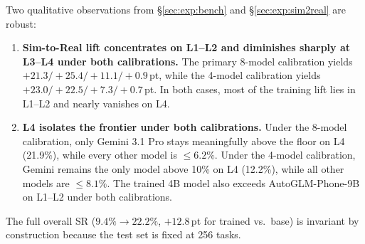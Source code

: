 \documentclass{llmxive}
\begin{document}
Two qualitative observations from §\ref{sec:exp:bench} and §\ref{sec:exp:sim2real} are robust:

\begin{enumerate}
\item \textbf{Sim-to-Real lift concentrates on L1--L2 and diminishes sharply at L3--L4 under both calibrations.} The primary 8-model calibration yields $+21.3/+25.4/+11.1/+0.9$\,pt, while the 4-model calibration yields $+23.0/+22.5/+7.3/+0.7$\,pt. In both cases, most of the training lift lies in L1--L2 and nearly vanishes on L4.
\item \textbf{L4 isolates the frontier under both calibrations.} Under the 8-model calibration, only Gemini 3.1 Pro stays meaningfully above the floor on L4 (21.9\%), while every other model is $\leq6.2\%$. Under the 4-model calibration, Gemini remains the only model above 10\% on L4 (12.2\%), while all other models are $\leq8.1\%$. The trained 4B model also exceeds AutoGLM-Phone-9B on L1--L2 under both calibrations.
\end{enumerate}

The full overall SR ($9.4\%\to 22.2\%$, $+12.8$\,pt for trained vs.\ base) is invariant by construction because the test set is fixed at 256 tasks.
\end{document}
